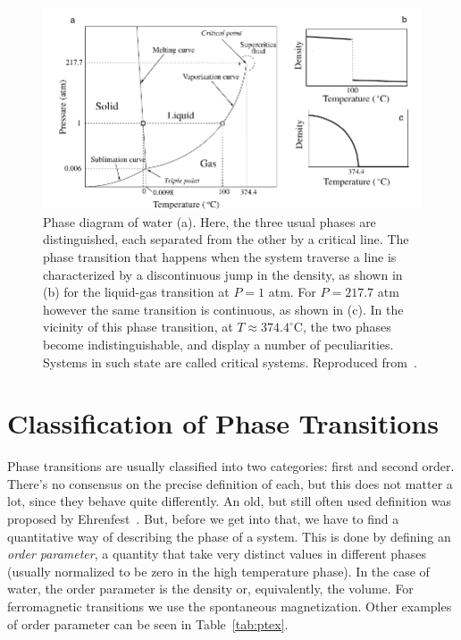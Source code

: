 \begin{figure}
\begin{center}
    \includegraphics[scale=1.0]{chapters/ch2-crit/figs/water}
\end{center}
\caption{Phase diagram of water (a). Here, the three usual phases are
    distinguished, each separated from the other by a critical line. The phase
    transition that happens when the system traverse a line is characterized by
    a discontinuous jump in the density, as shown in (b) for the liquid-gas
    transition at $P=1$ atm. For $P=217.7$ atm however the same transition is
    continuous, as shown in (c). In the vicinity of this phase transition, at
    $T\approx374.4^\circ$C, the two phases become indistinguishable, and
    display a number of peculiarities. Systems in such state are called
    critical systems. Reproduced from~\cite{Sole2011}.}
\label{fig:water}
\end{figure}


\section{Classification of Phase Transitions}
\label{sec:classification}

Phase transitions are usually classified into two categories: first and second
order. There's no consensus on the precise definition of each, but this does
not matter a lot, since they behave quite differently. An old, but still often
used definition was proposed by Ehrenfest~\cite{Jaeger1998}. But, before we get
into that, we have to find a quantitative way of describing the phase of a
system. This is done by defining an \textit{order parameter}, a quantity that
take very distinct values in different phases (usually normalized to be zero in
the high temperature phase). In the case of water, the order parameter is the
density or, equivalently, the volume. For ferromagnetic transitions we use the
spontaneous magnetization. Other examples of order parameter can be seen in
Table~\ref{tab:ptex}.

